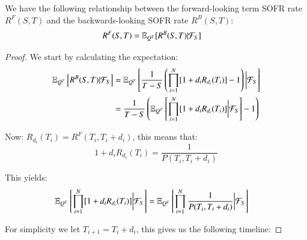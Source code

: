 \begin{proposition}
We have the following relationship between the forward-looking term SOFR rate $R^{F}(S,T)$ and the backwards-looking SOFR rate $R^{B}(S,T)$: 
\begin{align*}
R^{F}(S,T) &= \mathbb{E}_{Q^{T}}[R^{B}(S,T)|\mathcal{F}_{S}]    
\end{align*}
\end{proposition}

\begin{proof}

We start by calculating the expectation: 
\begin{align}
\label{eq: QT_expectation_R_Backwards}
\mathbb{E}_{Q^{T}}\left[
R^{B}(S,T)|\mathcal{F}_{S}
\right]
&= 
\mathbb{E}_{Q^{T}}\left[
\frac{1}{T-S}\left(
\prod_{i=1}^{N}[1+d_{i}R_{d_{i}}(T_{i})] - 1
\right)
\bigg{|}\mathcal{F}_{S}
\right] \nonumber \\ 
&= 
\frac{1}{T-S}
\left(\mathbb{E}_{Q^{T}}\left[
\prod_{i=1}^{N}[1+d_{i}R_{d_{i}}(T_{i})]\bigg{|}\mathcal{F}_{S} 
\right] - 1
\right)
\end{align}

Now: $R_{d_{i}}(T_{i}) = R^{F}(T_{i}, T_{i}+d_{i})$, this means that: 
\[
1 + d_{i}R_{d_{i}}(T_{i}) = \frac{1}{P(T_{i}, T_{i} + d_{i})}
\]

This yields:
\begin{align*}
\mathbb{E}_{Q^{T}}\left[
\prod_{i=1}^{N}[1+d_{i}R_{d_{i}}(T_{i})]\bigg{|}\mathcal{F}_{S} 
\right]
&= 
\mathbb{E}_{Q^{T}}\left[
\prod_{i=1}^{N}\frac{
1
}{
P(T_{i}, T_{i} + d_{i})
}
\bigg{|}\mathcal{F}_{S}
\right]
\end{align*}

For simplicity we let $T_{i+1} = T_{i} + d_{i}$, this gives us the following timeline:




\end{proof}

